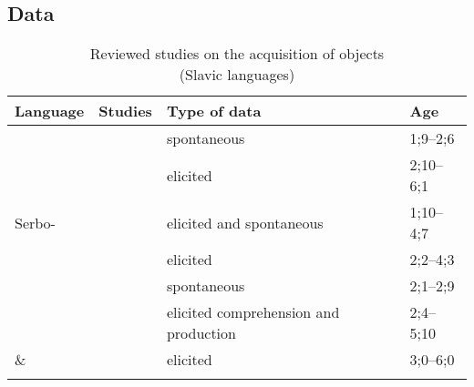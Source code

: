 \documentclass[output=paper,modfonts,newtxmath,hidelinks,]{langscibook}
\begin{document}
\subsection{Data}\label{17:sec:key:3.1}


\begin{table}[b]
	\captionsetup{format=hang}
	\caption{Reviewed studies on the acquisition of objects\\(Slavic languages)}
	\footnotesize
    \begin{tabularx}{\textwidth}{p{2cm}Q@{}ll}
    \lsptoprule
     \textbf{Language} & \textbf{Studies} & \textbf{Type of data} & \textbf{Age}\\
     \midrule
      & \citet{Gordishevsky-Avrutin2004} & spontaneous  & 1;9--2;6\vspace{5pt}\\ 
	    & \citet{Frolova2016,Frolova} 	& elicited  & 2;10--6;1\vspace{10pt}\\
 	
 	Serbo- & \citet{Stiasny2003,Stiasny2006} & elicited and spontaneous  & 1;10--4;7\vspace{10pt}\\
 	
      & \citet{Radeva-Bork2013,Radeva-Bork2015} & elicited  & 2;2--4;3\vspace{10pt}\\
     
      & \citet{Tryzna2015} & spontaneous  & 2;1--2;9\\
	  & 				 & elicited comprehension and production  & 2;4--5;10\vspace{10pt}\\
 	
     \newline\&  & \citet{Mykhaylyk-Sopata2016} & elicited  & 3;0--6;0\\
\lspbottomrule	
\end{tabularx} 
\label{17:table:table_1}
\end{table}
\end{document}
